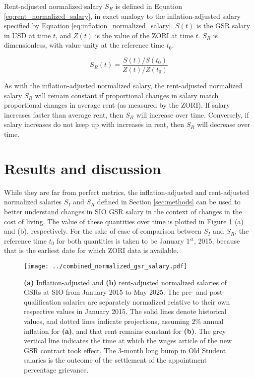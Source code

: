 \documentclass{article}
\begin{document}
Rent-adjusted normalized salary $S_R$ is defined in Equation \ref{eq:rent_normalized_salary}, in exact analogy to the inflation-adjusted salary specified by Equation \ref{eq:inflation_normalized_salary}. $S(t)$ is the GSR salary in USD at time $t$, and $Z(t)$ is the value of the ZORI at time $t$. $S_R$ is dimensionless, with value unity at the reference time $t_0$.

\begin{equation}
	S_R(t) = \frac{S(t)/S(t_0)}{Z(t)/Z(t_0)}
	\label{eq:rent_normalized_salary}
\end{equation}

As with the inflation-adjusted normalized salary, the rent-adjusted normalized salary $S_R$ will remain constant if proportional changes in salary match proportional changes in average rent (as measured by the ZORI). If salary increases faster than average rent, then $S_R$ will increase over time. Conversely, if salary increases do not keep up with increases in rent, then $S_R$ will decrease over time.

\section{Results and discussion}

While they are far from perfect metrics, the inflation-adjusted and rent-adjusted normalized salaries $S_I$ and $S_R$ defined in Section \ref{sec:methods} can be used to better understand changes in SIO GSR salary in the context of changes in the cost of living. The value of these quantities over time is plotted in Figure \ref{fig:normalized_salaries} (a) and (b), respectively. For the sake of ease of comparison between $S_I$ and $S_R$, the reference time $t_0$ for both quantities is taken to be January 1$^\text{st}$, 2015, because that is the earliest date for which ZORI data is available.

\begin{figure}[H]
	\centering
	\texttt{[image: ../combined\_normalized\_gsr\_salary.pdf]}
	\caption{\textbf{(a)} Inflation-adjusted and \textbf{(b)} rent-adjusted normalized salaries of GSRs at SIO from January 2015 to May 2025. The pre- and post-qualification salaries are separately normalized relative to their own respective values in January 2015. The solid lines denote historical values, and dotted lines indicate projections, assuming 2\% annual inflation for \textbf{(a)}, and that rent remains constant for \textbf{(b)}. The grey vertical line indicates the time at which the wages article of the new GSR contract took effect. The 3-month long bump in Old Student salaries is the outcome of the settlement of the appointment percentage grievance.}
	\label{fig:normalized_salaries}
\end{figure}
\end{document}
